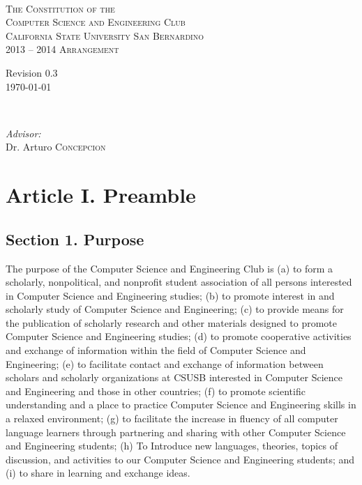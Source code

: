 \documentclass{article}
\begin{document}
\begin{titlepage}
\begin{center}

~ \\[2cm]
\textsc{\LARGE The Constitution of the}\\[0.5cm]
\textsc{\LARGE Computer Science and Engineering Club}\\[1.0cm]
\textsc{\large California State University San Bernardino}\\[5cm]
\textsc{\Large 2013 -- 2014 Arrangement}\\[10cm]

\begin{minipage}{0.4\textwidth}
\begin{flushleft} \large
Revision 0.3 \\
\today
\end{flushleft}
\end{minipage}
~
\begin{minipage}{0.55\textwidth}
\begin{flushright} \large
\emph{Advisor:} \\
Dr. Arturo \textsc{Concepcion}\\
\end{flushright}
\end{minipage}
\end{center}
\end{titlepage}

\newpage
\tableofcontents

\newpage
\section{Article I. Preamble}

  \subsection{Section 1. Purpose}
    The purpose of the Computer Science and Engineering Club is (a) to form a scholarly, nonpolitical, and nonprofit student association of all persons interested in Computer Science and Engineering studies; (b) to promote interest in and scholarly study of Computer Science and Engineering; (c) to provide means for the publication of scholarly research and other materials designed to promote Computer Science and Engineering studies; (d) to promote cooperative activities and exchange of information within the field of Computer Science and Engineering; (e) to facilitate contact and exchange of information between scholars and scholarly organizations at CSUSB interested in Computer Science and Engineering and those in other countries; (f) to promote scientific understanding and a place to practice Computer Science and Engineering skills in a relaxed environment; (g) to facilitate the increase in fluency of all computer language learners through partnering and sharing with other Computer Science and Engineering students; (h) To Introduce new languages, theories, topics of discussion,  and activities to our Computer Science and Engineering students; and (i) to share in learning and exchange ideas.
\end{document}
